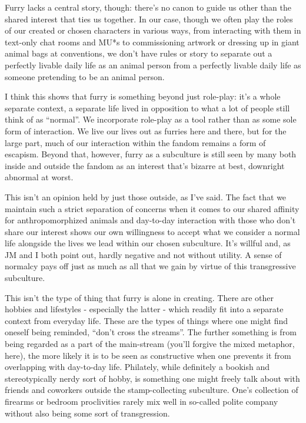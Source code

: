 Furry lacks a central story, though: there's no canon to guide us other than the shared interest that ties us together. In our case, though we often play the roles of our created or chosen characters in various ways, from interacting with them in text-only chat rooms and MU*s to commissioning artwork or dressing up in giant animal bags at conventions, we don't have rules or story to separate out a perfectly livable daily life as an animal person from a perfectly livable daily life as someone pretending to be an animal person.

I think this shows that furry is something beyond just role-play: it's a whole separate context, a separate life lived in opposition to what a lot of people still think of as ``normal''. We incorporate role-play as a tool rather than as some sole form of interaction. We live our lives out as furries here and there, but for the large part, much of our interaction within the fandom remains a form of escapism. Beyond that, however, furry as a subculture is still seen by many both inside and outside the fandom as an interest that's bizarre at best, downright abnormal at worst.

This isn't an opinion held by just those outside, as I've said. The fact that we maintain such a strict separation of concerns when it comes to our shared affinity for anthropomorphized animals and day-to-day interaction with those who don't share our interest shows our own willingness to accept what we consider a normal life alongside the lives we lead within our chosen subculture. It's willful and, as JM and I both point out, hardly negative and not without utility. A sense of normalcy pays off just as much as all that we gain by virtue of this transgressive subculture.

This isn't the type of thing that furry is alone in creating. There are other hobbies and lifestyles - especially the latter - which readily fit into a separate context from everyday life. These are the types of things where one might find oneself being reminded, ``don't cross the streams''. The further something is from being regarded as a part of the main-stream (you'll forgive the mixed metaphor, here), the more likely it is to be seen as constructive when one prevents it from overlapping with day-to-day life. Philately, while definitely a bookish and stereotypically nerdy sort of hobby, is something one might freely talk about with friends and coworkers outside the stamp-collecting subculture. One's collection of firearms or bedroom proclivities rarely mix well in so-called polite company without also being some sort of transgression.

